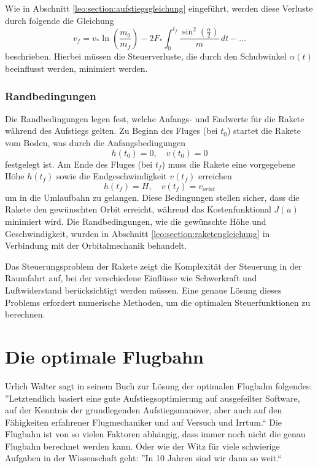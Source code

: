 Wie in Abschnitt \ref{leo:section:aufstiegsgleichung} eingeführt, werden diese Verluste durch folgende die Gleichung
\[
v_f = v_* \ln \left(\frac{m_0}{m_f}\right) - 2F_* \int_0^{t_f} \frac{\sin^2\left(\frac{\alpha}{2}\right)}{m} \, dt - \dots
\]
beschrieben. Hierbei müssen die Steuerverluste, die durch den Schubwinkel \( \alpha(t) \) beeinflusst werden, minimiert werden.

\subsubsection{Randbedingungen}
Die Randbedingungen legen fest, welche Anfangs- und Endwerte für die Rakete während des Aufstiegs gelten. Zu Beginn des Fluges (bei \( t_0 \)) startet die Rakete vom Boden, was durch die Anfangsbedingungen
\[
h(t_0) = 0, \quad v(t_0) = 0
\]
festgelegt ist. 
Am Ende des Fluges (bei \( t_f \)) muss die Rakete eine vorgegebene Höhe \( h(t_f) \) sowie die Endgeschwindigkeit \( v(t_f) \) erreichen
\[
h(t_f) = H, \quad v(t_f) = v_{orbit}
\]
um in die Umlaufbahn zu gelangen.
Diese Bedingungen stellen sicher, dass die Rakete den gewünschten Orbit erreicht, während das Kostenfunktional \( J(u) \) minimiert wird.
Die Randbedingungen, wie die gewünschte Höhe und Geschwindigkeit, wurden in Abschnitt \ref{leo:section:raketengleichung} in Verbindung mit der Orbitalmechanik behandelt.

Das Steuerungsproblem der Rakete zeigt die Komplexität der Steuerung in der Raumfahrt auf, bei der verschiedene Einflüsse wie Schwerkraft und Luftwiderstand berücksichtigt werden müssen. Eine genaue Lösung dieses Problems erfordert numerische Methoden, um die optimalen Steuerfunktionen zu berechnen.



\section{Die optimale Flugbahn}

Urlich Walter sagt in seinem Buch zur Lösung der optimalen Flugbahn folgendes: ''Letztendlich basiert eine gute Aufstiegsoptimierung auf ausgefeilter Software, auf der Kenntnis der grundlegenden Aufstiegsmanöver, aber auch auf den Fähigkeiten erfahrener Flugmechaniker und auf Versuch und Irrtum.``
Die Flugbahn ist von so vielen Faktoren abhängig, dass immer noch nicht die genau Flugbahn berechnet werden kann. 
Oder wie der Witz für viele schwierige Aufgaben in der Wissenschaft geht: ''In 10 Jahren sind wir dann so weit.``



